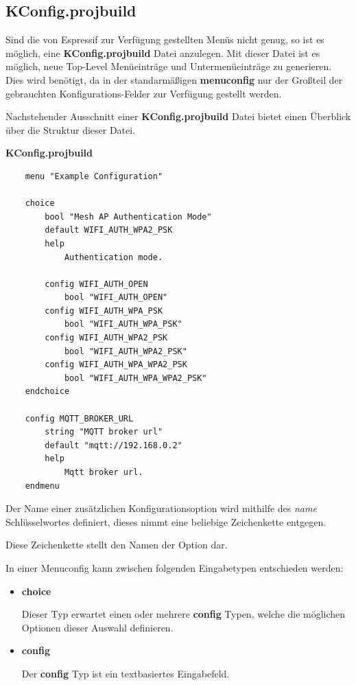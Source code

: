 \subsection{KConfig.projbuild}\label{sec:esp-idf-projbuild}
Sind die von Espressif zur Verfügung gestellten Menüs nicht genug, so ist es möglich, eine \textbf{KConfig.projbuild} Datei anzulegen. Mit dieser Datei ist es möglich, neue Top-Level Menüeinträge und Untermenüeinträge zu generieren. Dies wird benötigt, da in der standarmäßigen \textbf{menuconfig} nur der Großteil der gebrauchten Konfigurations-Felder zur Verfügung gestellt werden. 

Nachstehender Ausschnitt einer \textbf{KConfig.projbuild} Datei bietet einen Überblick über die Struktur dieser Datei.

\textbf{KConfig.projbuild}
\begin{verbatim}
    menu "Example Configuration"

    choice
        bool "Mesh AP Authentication Mode"
        default WIFI_AUTH_WPA2_PSK
        help
            Authentication mode.

        config WIFI_AUTH_OPEN
            bool "WIFI_AUTH_OPEN"
        config WIFI_AUTH_WPA_PSK
            bool "WIFI_AUTH_WPA_PSK"
        config WIFI_AUTH_WPA2_PSK
            bool "WIFI_AUTH_WPA2_PSK"
        config WIFI_AUTH_WPA_WPA2_PSK
            bool "WIFI_AUTH_WPA_WPA2_PSK"
    endchoice

    config MQTT_BROKER_URL
        string "MQTT broker url"
        default "mqtt://192.168.0.2"
        help
            Mqtt broker url.
    endmenu
\end{verbatim}

Der Name einer zusätzlichen Konfigurationsoption wird mithilfe des \textit{name} Schlüsselwortes definiert, dieses nimmt eine beliebige Zeichenkette entgegen.

Diese Zeichenkette stellt den Namen der Option dar.

\pagebreak

In einer Menuconfig kann zwischen folgenden Eingabetypen entschieden werden:

\begin{itemize}
    \item \textbf{choice}
    
    Dieser Typ erwartet einen oder mehrere \textbf{config} Typen, welche die möglichen Optionen dieser Auswahl definieren.
    \item \textbf{config}
    
    Der \textbf{config} Typ ist ein textbasiertes Eingabefeld.
\end{itemize}

